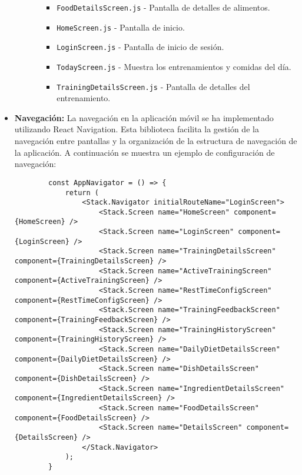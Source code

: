 \begin{itemize}
\begin{itemize}
\begin{itemize}
\begin{itemize}
                \item \texttt{FoodDetailsScreen.js} - Pantalla de detalles de alimentos.
                \item \texttt{HomeScreen.js} - Pantalla de inicio.
                \item \texttt{LoginScreen.js} - Pantalla de inicio de sesión.
                \item \texttt{TodayScreen.js} - Muestra los entrenamientos y comidas del día.
                \item \texttt{TrainingDetailsScreen.js} - Pantalla de detalles del entrenamiento.
            \end{itemize}
        \end{itemize}
    \end{itemize}

    \item \textbf{Navegación:} La navegación en la aplicación móvil se ha implementado utilizando React Navigation. Esta biblioteca facilita la gestión de la navegación entre pantallas y la organización de la estructura de navegación de la aplicación. A continuación se muestra un ejemplo de configuración de navegación:
    \begin{verbatim}
        const AppNavigator = () => {
            return (
                <Stack.Navigator initialRouteName="LoginScreen">
                    <Stack.Screen name="HomeScreen" component={HomeScreen} />
                    <Stack.Screen name="LoginScreen" component={LoginScreen} />
                    <Stack.Screen name="TrainingDetailsScreen" component={TrainingDetailsScreen} />
                    <Stack.Screen name="ActiveTrainingScreen" component={ActiveTrainingScreen} />
                    <Stack.Screen name="RestTimeConfigScreen" component={RestTimeConfigScreen} />
                    <Stack.Screen name="TrainingFeedbackScreen" component={TrainingFeedbackScreen} />
                    <Stack.Screen name="TrainingHistoryScreen" component={TrainingHistoryScreen} />
                    <Stack.Screen name="DailyDietDetailsScreen" component={DailyDietDetailsScreen} />
                    <Stack.Screen name="DishDetailsScreen" component={DishDetailsScreen} />
                    <Stack.Screen name="IngredientDetailsScreen" component={IngredientDetailsScreen} />
                    <Stack.Screen name="FoodDetailsScreen" component={FoodDetailsScreen} />
                    <Stack.Screen name="DetailsScreen" component={DetailsScreen} />
                </Stack.Navigator>
            );
        }


\end{verbatim}
\end{itemize}
